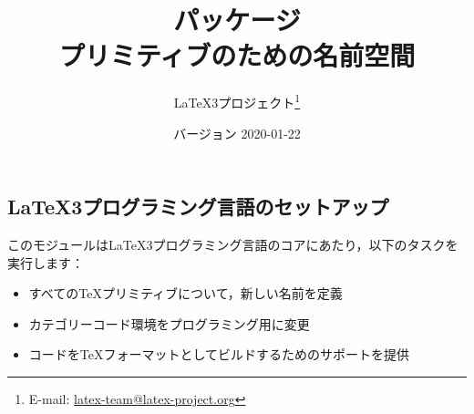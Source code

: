 \documentclass[uplatex,dvipdfmx,full,kernel]{wtpl3doc}
\begin{document}
\title{パッケージ\\ プリミティブのための名前空間}
\author{%
 \LaTeX3プロジェクト\thanks
   {%
     E-mail:
       \href{mailto:latex-team@latex-project.org}
         {latex-team@latex-project.org}%
   }%
}
\date{バージョン 2020-01-22}

\maketitle

\begin{documentation}

\section{\LaTeX3プログラミング言語のセットアップ}

このモジュールは\LaTeX3プログラミング言語のコアにあたり，以下のタスクを
実行します：
%
\begin{itemize}
  \item すべての\TeX プリミティブについて，新しい名前を定義
  \item カテゴリーコード環境をプログラミング用に変更
  \item コードを\TeX フォーマットとしてビルドするためのサポートを提供
\end{itemize}


\end{documentation}
\end{document}
